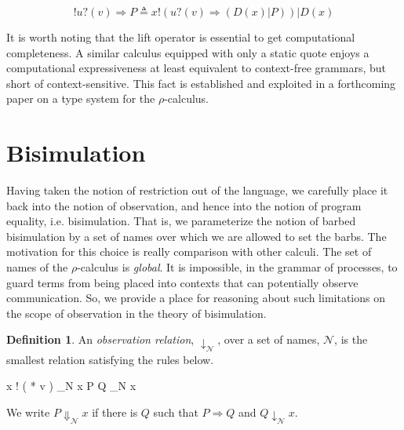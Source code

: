\documentclass[]{amsart}
\newcommand{\id}[1]{\texttt{#1}}
\newcommand{\juxtap}{\mathbin{\id{|}}}
\newcommand{\concat}{\Rightarrow}
\newcommand{\nameeq}{\mathbin{\equiv_N}}
\newcommand{\binpar}[2]{#1 \juxtap #2}
\newcommand{\outputp}[2]{#1 ! ( * #2 )}
\newcommand{\prefix}[3]{#1 ? ( #2 ) \concat #3}
\newcommand{\lift}[2]{#1 ! ( #2 )}
\newcommand{\bangp}[1]{\id{!} #1}
\newcommand{\wred}{\Rightarrow}
\theoremstyle{definition}
\newtheorem{defn}[thm]{Definition}
\theoremstyle{remark}
\numberwithin{equation}{subsection}
\newcommand{\pic}{$\pi$-calculus}
\newcommand{\rhoc}{$\rho$-calculus}
\begin{document}
\begin{equation*}
\bangp{\prefix{u}{v}{P}} 
	\triangleq 
	\binpar{\lift{x}{\prefix{u}{v}{(\binpar{D(x)}{P})}}}{D(x)}
\end{equation*}

It is worth noting that the lift operator is essential to get
computational completeness. A similar calculus equipped with only a
static quote enjoys a computational expressiveness at least equivalent
to context-free grammars, but short of context-sensitive. This fact is
established and exploited in a forthcoming paper on a type system for
the {\rhoc}.

\section{Bisimulation}

Having taken the notion of restriction out of the language, we
carefully place it back into the notion of observation, and hence into
the notion of program equality, i.e. bisimulation. That is, we
parameterize the notion of barbed bisimulation by a set of names over
which we are allowed to set the barbs. The motivation for this choice
is really comparison with other calculi. The set of names of the
{\rhoc} is \textit{global}. It is impossible, in the grammar of
processes, to guard terms from being placed into contexts that can
potentially observe communication. So, we provide a place for
reasoning about such limitations on the scope of observation in the
theory of bisimulation.


\begin{defn}
An \emph{observation relation}, $\downarrow_{\mathcal N}$, over a set
of names, $\mathcal N$, is the smallest relation satisfying the rules
below.

\infrule[Out-barb]{y \in {\mathcal N}, \; x \nameeq y}
		  {\outputp{x}{v} \downarrow_{\mathcal N} x}
		  {\binpar{P}{Q} \downarrow_{\mathcal N} x}

We write $P \Downarrow_{\mathcal N} x$ if there is $Q$ such that 
$P \wred Q$ and $Q \downarrow_{\mathcal N} x$.
\end{defn}
\end{document}
